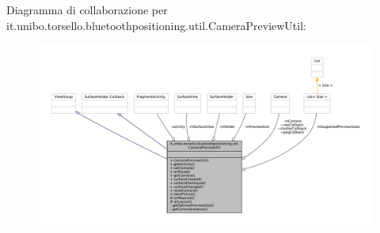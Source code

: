 Diagramma di collaborazione per it.\+unibo.\+torsello.\+bluetoothpositioning.\+util.\+Camera\+Preview\+Util\+:
\nopagebreak
\begin{figure}[H]
\begin{center}
\leavevmode
\includegraphics[width=350pt]{classit_1_1unibo_1_1torsello_1_1bluetoothpositioning_1_1util_1_1CameraPreviewUtil__coll__graph}
\end{center}
\end{figure}

